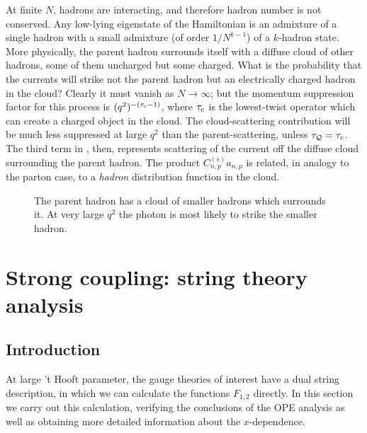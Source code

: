 At finite $N$, hadrons are interacting, and therefore hadron number is
not conserved.  Any low-lying eigenstate of the Hamiltonian is an
admixture of a single hadron with a small admixture (of order
$1/N^{k-1}$) of a $k$-hadron state.  More physically, the parent
hadron surrounds itself with a diffuse cloud of other hadrons, some of
them uncharged but some charged.  What is the probability that the
currents will strike not the parent hadron but an electrically charged
hadron in the cloud?  Clearly it must vanish as $N\to\infty$; but the
momentum suppression factor for this process is $(q^2)^{-(\tau_{\rm
c}-1)}$, where $\tau_{\rm c}$ is the lowest-twist operator which can
create a charged object in the cloud.  The cloud-scattering
contribution will be much less suppressed at large $q^2$ than the
parent-scattering, unless $\tau_{\cal Q}=\tau_{\rm c}$.  The third term in
, then,
represents scattering of the current off the diffuse cloud
surrounding the parent hadron.
The product $C_{n,p}^{(s)}a_{n,p}$ is related, in analogy
to the parton case, to a {\it hadron} distribution function
in the cloud.

\begin{figure}[h]
\begin{center}
\leavevmode
{}
\end{center}
\caption{The parent hadron has a cloud of smaller hadrons which
surrounds it. At very large $q^2$ the photon is most likely to 
strike the smaller hadron.}
\end{figure}

\section{Strong coupling: string theory analysis}

\subsection{Introduction}

At large 't Hooft parameter, the gauge theories of interest have a dual string
description, in which we can calculate the functions $F_{1,2}$ directly.
In this section we carry out this calculation, verifying the conclusions of
the OPE analysis as well as obtaining more detailed information about the
$x$-dependence.


